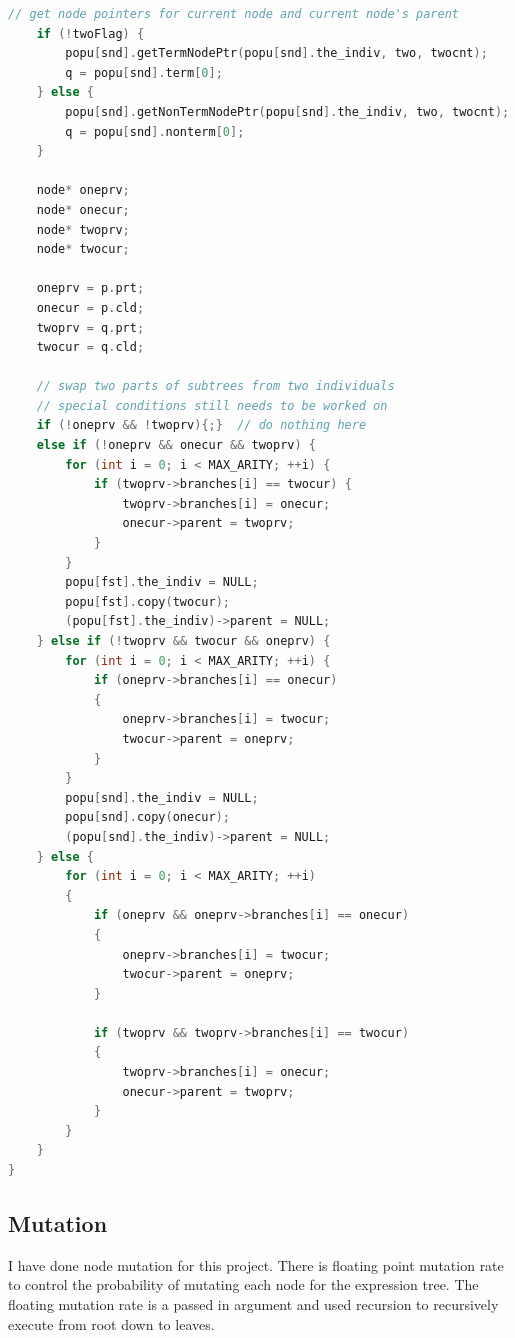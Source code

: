 \documentclass[10pt,b5paper]{article}
\begin{document}
\begin{lstlisting}[language=c++]
    // get node pointers for current node and current node's parent
    if (!twoFlag) {        
        popu[snd].getTermNodePtr(popu[snd].the_indiv, two, twocnt);
        q = popu[snd].term[0];
    } else {        
        popu[snd].getNonTermNodePtr(popu[snd].the_indiv, two, twocnt);
        q = popu[snd].nonterm[0];
    }

    node* oneprv;
    node* onecur;
    node* twoprv;
    node* twocur;
    
    oneprv = p.prt;
    onecur = p.cld;
    twoprv = q.prt;
    twocur = q.cld;

    // swap two parts of subtrees from two individuals
    // special conditions still needs to be worked on
    if (!oneprv && !twoprv){;}  // do nothing here
    else if (!oneprv && onecur && twoprv) {    
        for (int i = 0; i < MAX_ARITY; ++i) {        
            if (twoprv->branches[i] == twocur) {            
                twoprv->branches[i] = onecur;
                onecur->parent = twoprv;
            }
        }
        popu[fst].the_indiv = NULL;
        popu[fst].copy(twocur);
        (popu[fst].the_indiv)->parent = NULL;
    } else if (!twoprv && twocur && oneprv) {
        for (int i = 0; i < MAX_ARITY; ++i) {        
            if (oneprv->branches[i] == onecur) 
            {
                oneprv->branches[i] = twocur;
                twocur->parent = oneprv;
            }
        }
        popu[snd].the_indiv = NULL;
        popu[snd].copy(onecur);
        (popu[snd].the_indiv)->parent = NULL;
    } else {    
        for (int i = 0; i < MAX_ARITY; ++i) 
        {
            if (oneprv && oneprv->branches[i] == onecur) 
            {
                oneprv->branches[i] = twocur;
                twocur->parent = oneprv;
            }
        
            if (twoprv && twoprv->branches[i] == twocur)
            {
                twoprv->branches[i] = onecur;
                onecur->parent = twoprv;
            }
        }
    }
}
\end{lstlisting}
\subsection{Mutation}
\label{sec-1-4}
I have done node mutation for this project. There is floating point mutation rate to control the probability of mutating each node for the expression tree. The floating mutation rate is a passed in argument and used recursion to recursively execute from root down to leaves. 
\end{document}
